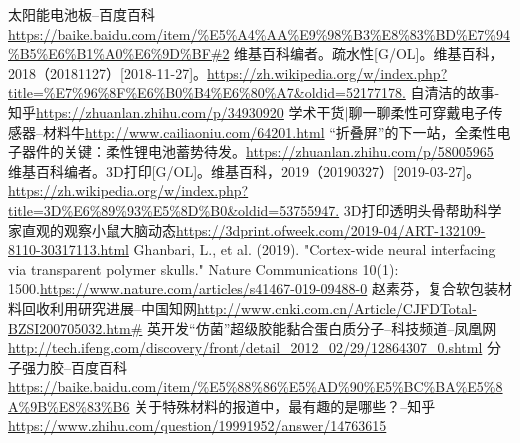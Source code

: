 \documentclass[UTF8,9pt]{ctexart}
\begin{document}
\begin{thebibliography}{99}
    太阳能电池板--百度百科\url{https://baike.baidu.com/item/%E5%A4%AA%E9%98%B3%E8%83%BD%E7%94%B5%E6%B1%A0%E6%9D%BF#2}
    维基百科编者。疏水性[G/OL]。维基百科，2018（20181127）[2018-11-27]。\url{https://zh.wikipedia.org/w/index.php?title=%E7%96%8F%E6%B0%B4%E6%80%A7&oldid=52177178.}
    自清洁的故事- 知乎\url{https://zhuanlan.zhihu.com/p/34930920}
    学术干货|聊一聊柔性可穿戴电子传感器--材料牛\url{http://www.cailiaoniu.com/64201.html}
    “折叠屏”的下一站，全柔性电子器件的关键：柔性锂电池蓄势待发。\url{https://zhuanlan.zhihu.com/p/58005965}
    维基百科编者。3D打印[G/OL]。维基百科，2019（20190327）[2019-03-27]。\url{https://zh.wikipedia.org/w/index.php?title=3D%E6%89%93%E5%8D%B0&oldid=53755947.}
    3D打印透明头骨帮助科学家直观的观察小鼠大脑动态\url{https://3dprint.ofweek.com/2019-04/ART-132109-8110-30317113.html}
    Ghanbari, L., et al. (2019). "Cortex-wide neural interfacing via transparent polymer skulls." Nature Communications 10(1): 1500.\url{https://www.nature.com/articles/s41467-019-09488-0}
    赵素芬，复合软包装材料回收利用研究进展--中国知网\url{http://www.cnki.com.cn/Article/CJFDTotal-BZSI200705032.htm#}
    英开发“仿菌”超级胶能黏合蛋白质分子--科技频道--凤凰网\url{http://tech.ifeng.com/discovery/front/detail_2012_02/29/12864307_0.shtml}
    分子强力胶--百度百科\url{https://baike.baidu.com/item/%E5%88%86%E5%AD%90%E5%BC%BA%E5%8A%9B%E8%83%B6}
    关于特殊材料的报道中，最有趣的是哪些？--知乎\url{https://www.zhihu.com/question/19991952/answer/14763615}
\end{thebibliography}
\end{document}
